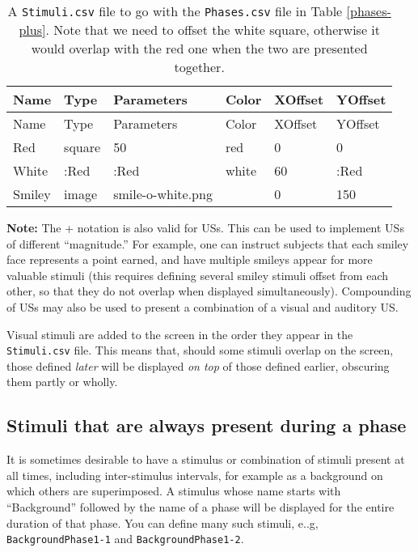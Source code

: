 \documentclass[11pt,]{article}
\begin{document}
\begin{longtable}[c]{@{}llllll@{}}
\caption{A \texttt{Stimuli.csv} file to go with the \texttt{Phases.csv}
file in Table \ref{phases-plus}. Note that we need to offset the white
square, otherwise it would overlap with the red one when the two are
presented together. \label{stimuli-plus}}\tabularnewline
\toprule
Name & Type & Parameters & Color & XOffset & YOffset\tabularnewline
\midrule
\endfirsthead
\toprule
Name & Type & Parameters & Color & XOffset & YOffset\tabularnewline
\midrule
\endhead
Red & square & 50 & red & 0 & 0\tabularnewline
White & :Red & :Red & white & 60 & :Red\tabularnewline
Smiley & image & smile-o-white.png & & 0 & 150\tabularnewline
\bottomrule
\end{longtable}

\textbf{Note:} The + notation is also valid for USs. This can be used to
implement USs of different ``magnitude.'' For example, one can instruct
subjects that each smiley face represents a point earned, and have
multiple smileys appear for more valuable stimuli (this requires
defining several smiley stimuli offset from each other, so that they do
not overlap when displayed simultaneously). Compounding of USs may also
be used to present a combination of a visual and auditory US.


Visual stimuli are added to the screen in the order they appear in the
\texttt{Stimuli.csv} file. This means that, should some stimuli overlap
on the screen, those defined \emph{later} will be displayed \emph{on
top} of those defined earlier, obscuring them partly or wholly.

\subsection{Stimuli that are always present during a
phase}\label{stimuli-that-are-always-present-during-a-phase}

It is sometimes desirable to have a stimulus or combination of stimuli
present at all times, including inter-stimulus intervals, for example as
a background on which others are superimposed. A stimulus whose name
starts with ``Background'' followed by the name of a phase will be
displayed for the entire duration of that phase. You can define many
such stimuli, e..g, \texttt{BackgroundPhase1-1} and
\texttt{BackgroundPhase1-2}.
\end{document}
